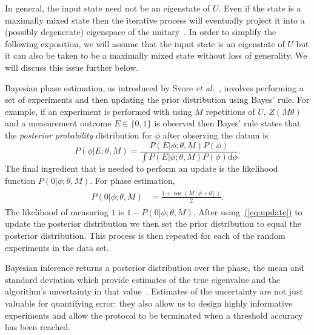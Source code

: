 \documentclass[aps,pra,amsmath,twocolumn,amssymb,superscriptaddress]{revtex4-1}
\newcommand{\eq}[1]{\hyperref[eq:#1]{(\ref*{eq:#1})}}
\newcommand{\etal}{\emph{et al.}}
\begin{document}
In general, the input state need not be an eigenstate of $U$.  Even if the state is a maximally mixed state then the iterative process will eventually project it into
a (possibly degenerate) eigenspace of the unitary~\cite{kitaev2002classical}.  In order to simplify the following exposition, we will assume that the input state is an eigenstate of $U$ but it can also be taken
to be a maximally mixed state without loss of generality.  We will discuss this issue further below.



Bayesian phase estimation, as introduced by Svore \etal~\cite{SHF14}, involves performing a 
set of experiments and then updating the prior distribution using Bayes' rule.
For example, if an experiment is performed with using $M$ repetitions of $U$,
$Z(M \theta)$ and a measurement outcome $E\in \{0,1\}$ is observed then Bayes'
rule states that the \emph{posterior probability} distribution for $\phi$
after observing the datum is
\begin{equation}
P(\phi|E;\theta,M) = \frac{P(E|\phi;\theta,M)P(\phi)}{\int P(E|\phi;\theta,M)P(\phi)\mathrm{d}{\phi}}.\label{eq:update}
\end{equation}
The final ingredient that is needed to perform an update is the likelihood
function $P(0|\phi;\theta,M)$. For phase estimation,
\begin{gather}
    \label{eq:likenodecohere}
    \begin{aligned}
        P(0|\phi;\theta,M) & = \frac{1+\cos(M[\phi +\theta])}{2}.
    \end{aligned}
\end{gather}
The likelihood of measuring $1$ is $1-P(0|\phi;\theta,M)$.
After using~\eq{update} to update the posterior distribution we then set the prior distribution to equal the posterior distribution.  This process is then repeated for each of the random experiments in the data set.

Bayesian inference returns a posterior
distribution over the phase, the mean and standard deviation which
provide estimates of the true eigenvalue and the algorithm's
uncertainty in that value~\cite{granade_robust_2012,ferrie_high_2014}. Estimates of
the uncertainty are not just valuable for quantifying error: they also allow us to design highly informative experiments 
 and allow the protocol to be terminated when a threshold accuracy has been reached.
\end{document}
